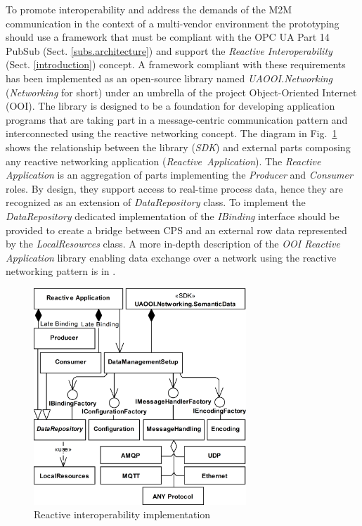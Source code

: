 \documentclass[runningheads]{llncs}
\begin{document}
To promote interoperability and address the demands of the M2M communication in the context of a multi-vendor environment the prototyping should use a framework that must be compliant with the OPC UA Part 14 PubSub (Sect. \ref{subs.architecture}) and support the \emph{Reactive Interoperability} (Sect. \ref{introduction}) concept. A framework compliant with these requirements has been implemented as an open-source library named \emph{UAOOI.Networking} (\emph{Networking} for short) under an umbrella of the project Object-Oriented Internet  (OOI)\cite{mariusz_postol_2020_4361640}. The library is designed to be a foundation for developing application programs that are taking part in a message-centric communication pattern and interconnected using the reactive networking concept. The diagram in Fig.~\ref{figure2.UADataApplicationArchitecture} shows the relationship between the library (\emph{SDK}) and external parts composing any reactive networking application (\emph{Reactive\ Application}). The \emph{Reactive Application} is an aggregation of parts implementing the \emph{Producer} and \emph{Consumer} roles. By design, they support access to real-time process data, hence they are recognized as an extension of \emph{DataRepository} class. To implement the \emph{DataRepository} dedicated implementation of the \emph{IBinding} interface should be provided to create a bridge between CPS and an external row data represented by the \emph{LocalResources} class. A more in-depth description of the \emph{OOI Reactive Application} library enabling data exchange over a network using the reactive networking pattern is in \cite{mpostol2020}.

\begin{figure}
      \centering
      \includegraphics[width=8cm]{../../.Media/UADataApplicationArchitecture.png}
      \caption{Reactive interoperability implementation}\label{figure2.UADataApplicationArchitecture}
\end{figure}
\end{document}
